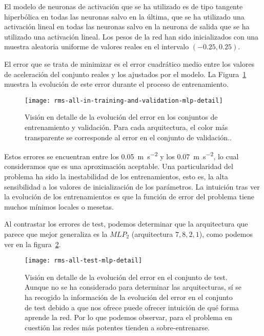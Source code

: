 El modelo de neuronas de activación que se ha utilizado es de tipo tangente hiperbólica en todas las neuronas salvo en la última, que se ha utilizado una activación lineal en todas las neuronas salvo en la neurona de salida que se ha utilizado una activación lineal. Los pesos de la red han sido inicializados con una muestra aleatoria uniforme de valores reales en el intervalo $(-0.25, 0.25)$.

El error que se trata de minimizar es el error cuadrático medio entre los valores de aceleración del conjunto reales y los ajustados por el modelo. La Figura~\ref{fig:rms-all-in-training-and-validation-mlp-detail} muestra la evolución de este error durante el proceso de entrenamiento.

\begin{figure}
	\centering
	\texttt{[image: rms-all-in-training-and-validation-mlp-detail]}
	\caption[Evolución del error en entrenamiento en los \ac{mlp} para las arquitecturas seleccionadas]{Visión en detalle de la evolución del error en los conjuntos de entrenamiento y validación. Para cada arquitectura, el color más transparente se corresponde al error en el conjunto de validación..}
	\label{fig:rms-all-in-training-and-validation-mlp-detail}
\end{figure}

Estos errores se encuentran entre los \SI{0.05}{\metre\per\square\second} y los \SI{0.07}{\metre\per\square\second}, lo cual consideramos que es una aproximación aceptable. Una particularidad del problema ha sido la inestabilidad de los entrenamientos, esto es, la alta sensibilidad a los valores de inicialización de los parámetros. La intuición tras ver la evolución de los entrenamientos es que la función de error del problema tiene muchos mínimos locales o mesetas.

Al contrastar los errores de test, podemos determinar que la arquitectura que parece que mejor generaliza es la $MLP_2$ (arquitectura $7, 8, 2, 1$), como podemos ver en la figura~\ref{fig:rms-all-test-mlp-detail}.

\begin{figure}
	\centering
	\texttt{[image: rms-all-test-mlp-detail]}
	\caption[Evolución del error en el conjunto de test durante el entrenamiento]{Visión en detalle de la evolución del error en el conjunto de test. Aunque no se ha considerado para determinar las arquitecturas, sí se ha recogido la información de la evolución del error en el conjunto de test debido a que nos ofrece puede ofrecer intuición de qué forma aprende la red. Por lo que podemos observar, para el problema en cuestión las redes más potentes tienden a sobre-entrenarse.}
	\label{fig:rms-all-test-mlp-detail}
\end{figure}

